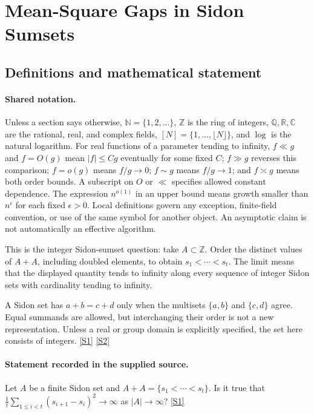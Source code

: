 \documentclass[11pt,a4paper]{article}
\newcommand{\N}{\mathbb{N}}
\newcommand{\Z}{\mathbb{Z}}
\newcommand{\Q}{\mathbb{Q}}
\newcommand{\R}{\mathbb{R}}
\newcommand{\C}{\mathbb{C}}
\newcommand{\sref}[2]{\hyperlink{source:#1:#2}{[S#2]}}
\begin{document}
\section{Mean-Square Gaps in Sidon Sumsets}\label{statement}


\subsection{Definitions and mathematical statement}

\paragraph{Shared notation.}Unless a section says otherwise, $\N=\{1,2,\ldots\}$,
$\Z$ is the ring of integers, $\Q,\R,\C$ are the rational, real, and complex
fields, $[N]=\{1,\ldots,\lfloor N\rfloor\}$, and $\log$ is the natural
logarithm. For real functions of a parameter tending to infinity,
$f\ll g$ and $f=O(g)$ mean $|f|\leq Cg$ eventually for some fixed $C$;
$f\gg g$ reverses this comparison; $f=o(g)$ means $f/g\to0$;
$f\sim g$ means $f/g\to1$; and $f\asymp g$ means both order bounds.
A subscript on $O$ or $\ll$ specifies allowed constant dependence.
The expression $n^{o(1)}$ in an upper bound means growth smaller than
$n^\epsilon$ for each fixed $\epsilon>0$. Local definitions govern any
exception, finite-field convention, or use of the same symbol for another
object. An asymptotic claim is not automatically an effective algorithm.



This is the integer Sidon-sumset question: take $A\subset\Z$. Order the distinct values of $A+A$, including doubled elements, to obtain $s_1<\cdots<s_t$. The limit means that the displayed quantity tends to infinity along every sequence of integer Sidon sets with cardinality tending to infinity.

A Sidon set has $a+b=c+d$ only when the multisets $\{a,b\}$ and $\{c,d\}$ agree. Equal summands are allowed, but interchanging their order is not a new representation. Unless a real or group domain is explicitly specified, the set here consists of integers. \sref{statement}{1} \sref{statement}{2}

\paragraph{Statement recorded in the supplied source.}
Let $A$ be a finite Sidon set and $A+A=\{s_1<\cdots<s_t\}$. Is it true that $ \frac{1}{t}\sum_{1\leq i<t}(s_{i+1}-s_i)^2 \to \infty $ as $\lvert A\rvert\to \infty$? \sref{statement}{1}
\end{document}
